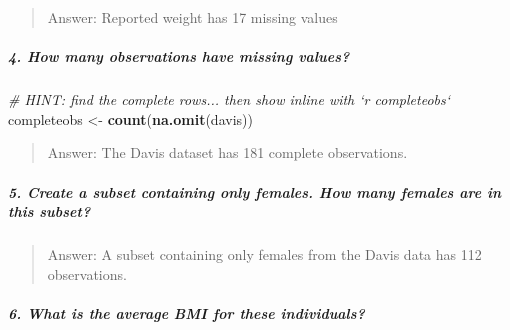 \documentclass[]{elsarticle} %
\newenvironment{Shaded}{\begin{snugshade}}{\end{snugshade}}
\newcommand{\KeywordTok}[1]{\textcolor[rgb]{0.13,0.29,0.53}{\textbf{{#1}}}}
\newcommand{\StringTok}[1]{\textcolor[rgb]{0.31,0.60,0.02}{{#1}}}
\newcommand{\CommentTok}[1]{\textcolor[rgb]{0.56,0.35,0.01}{\textit{{#1}}}}
\newcommand{\NormalTok}[1]{{#1}}
\begin{document}
\begin{quote}
Answer: Reported weight has 17 missing values
\end{quote}

\subparagraph{4. How many observations have missing
values?}\label{how-many-observations-have-missing-values}

\begin{Shaded}
\begin{Highlighting}[]
\CommentTok{# HINT: find the complete rows... then show inline with `r completeobs`}
\NormalTok{completeobs <-}\StringTok{ }\KeywordTok{count}\NormalTok{(}\KeywordTok{na.omit}\NormalTok{(davis))}
\end{Highlighting}
\end{Shaded}

\begin{quote}
Answer: The Davis dataset has 181 complete observations.
\end{quote}

\subparagraph{5. Create a subset containing only females. How many
females are in this
subset?}\label{create-a-subset-containing-only-females.-how-many-females-are-in-this-subset}

\begin{Shaded}
\end{Shaded}

\begin{quote}
Answer: A subset containing only females from the Davis data has 112
observations.
\end{quote}

\subparagraph{6. What is the average BMI for these
individuals?}\label{what-is-the-average-bmi-for-these-individuals}
\end{document}
